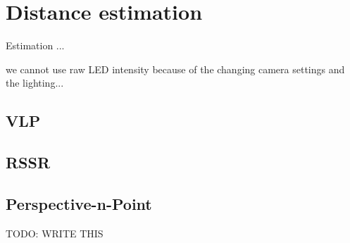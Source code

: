 
\chapter{Distance estimation\label{chap:p3p}}

Estimation ...

we cannot use raw LED intensity because of the changing camera settings and the lighting...

\section{VLP}

\section{RSSR}

\section{Perspective-n-Point}

TODO: WRITE THIS
